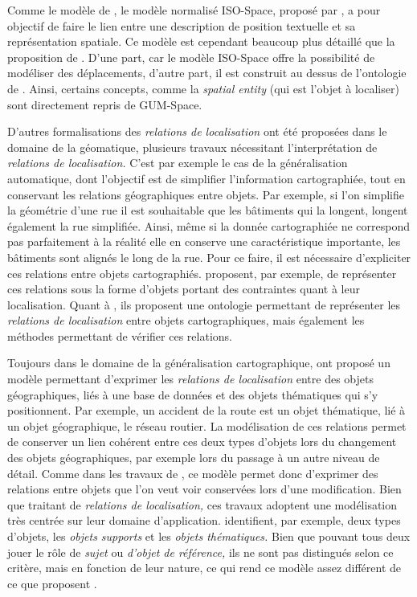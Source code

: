Comme le modèle de \textcite{Vasardini2013}, le modèle normalisé
ISO-Space, proposé par \textcite{Pustejovsky2017}, a pour objectif de
faire le lien entre une description de position textuelle et sa
représentation spatiale. Ce modèle est cependant beaucoup plus
détaillé que la proposition de \textcite{Vasardini2013}. D'une part,
car le modèle ISO-Space offre la possibilité de modéliser des
déplacements, d'autre part, il est construit au dessus de l'ontologie
de \textcite{Bateman2010}. Ainsi, certains concepts, comme la
\emph{spatial entity} (qui est l'objet à localiser) sont directement
repris de GUM-Space.

D'autres formalisations des \emph{relations de localisation} ont été
proposées dans le domaine de la géomatique, plusieurs travaux
nécessitant l'interprétation de \emph{relations de localisation.}
C'est par exemple le cas de la généralisation automatique, dont
l'objectif est de simplifier l'information cartographiée, tout en
conservant les relations géographiques entre objets. Par exemple, si
l'on simplifie la géométrie d'une rue il est souhaitable que les
bâtiments qui la longent, longent également la rue simplifiée. Ainsi,
même si la donnée cartographiée ne correspond pas parfaitement à la
réalité elle en conserve une caractéristique importante, les bâtiments
sont alignés le long de la rue. Pour ce faire, il est nécessaire
d'expliciter ces relations entre objets
cartographiés. \textcite{Duchene2004,Gaffuri2008} proposent, par
exemple, de représenter ces relations sous la forme d'objets portant
des contraintes quant à leur localisation. Quant à
\textcite{Touya2012}, ils proposent une ontologie permettant de
représenter les \emph{relations de localisation} entre objets
cartographiques, mais également les méthodes permettant de vérifier
ces relations.

Toujours dans le domaine de la généralisation cartographique,
\textcite{Jaara2012} ont proposé un modèle permettant d'exprimer les
\emph{relations de localisation} entre des objets géographiques, liés
à une base de données et des objets thématiques qui s'y
positionnent. Par exemple, un accident de la route est un objet
thématique, lié à un objet géographique, le réseau routier. La
modélisation de ces relations permet de conserver un lien cohérent
entre ces deux types d'objets lors du changement des objets
géographiques, par exemple lors du passage à un autre niveau de
détail. Comme dans les travaux de \textcite{Duchene2004,Gaffuri2008,
  Touya2012}, ce modèle permet donc d'exprimer des relations entre
objets que l'on veut voir conservées lors d'une modification. Bien que
traitant de \emph{relations de localisation,} ces travaux adoptent une
modélisation très centrée sur leur domaine
d’application. \textcite{Jaara2012} identifient, par exemple, deux
types d'objets, les \emph{objets supports} et les \emph{objets
  thématiques.} Bien que pouvant tous deux jouer le rôle de
\emph{sujet} ou \emph{d'objet de référence,} ils ne sont pas
distingués selon ce critère, mais en fonction de leur nature, ce qui
rend ce modèle assez différent de ce que proposent
\textcite{Bateman2010,Pustejovsky2017}.

